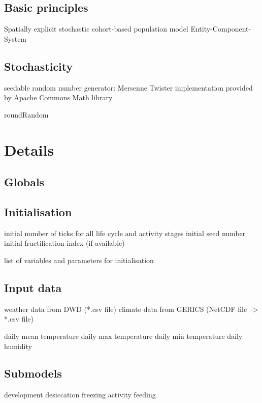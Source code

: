 \documentclass[a4paper, 11pt]{article}
\begin{document}
\subsection{Basic principles}
Spatially explicit stochastic cohort-based population model
Entity-Component-System


\subsection{Stochasticity}
seedable random number generator: 
Mersenne Twister implementation 
provided by Apache Commons Math library

roundRandom


\section{Details}

\subsection{Globals}


\subsection{Initialisation}
initial number of ticks for all life cycle and activity stages 
initial seed number
initial fructification index (if available)

list of variables and parameters for initialisation


\subsection{Input data}
weather data from DWD (*.csv file) 
climate data from GERICS (NetCDF file --> *.csv file) 

daily mean temperature
daily max temperature
daily min temperature
daily humidity


\subsection{Submodels}
development
desiccation
freezing
activity
feeding
\end{document}
